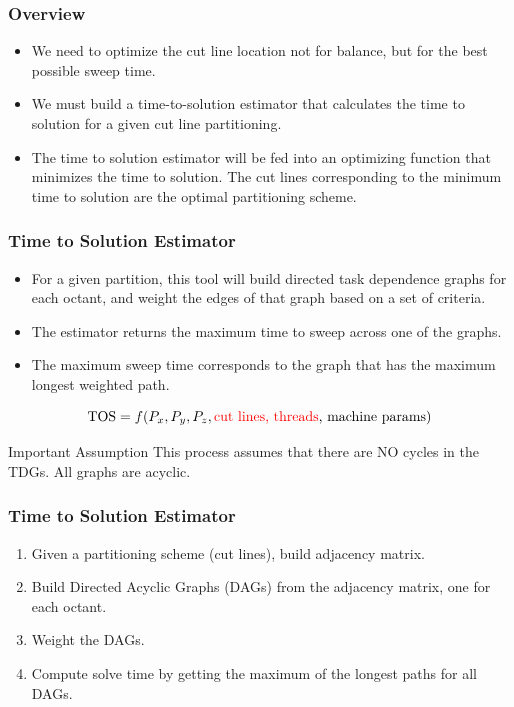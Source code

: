 \documentclass[xcolor={usenames,dvipsnames,svgnames,table}]{beamer}
\begin{document}
\begin{frame}[t]\frametitle{Overview}
\begin{block}{}
\begin{itemize}
	\item We need to optimize the cut line location not for balance, but for the best possible sweep time.
	\item We must build a time-to-solution estimator that calculates the time to solution for a given cut line partitioning.
	\item The time to solution estimator will be fed into an optimizing function that minimizes the time to solution. The cut lines corresponding to the minimum time to solution are the optimal partitioning scheme.
\end{itemize}
\end{block}
\end{frame}

\begin{frame}[t]\frametitle{Time to Solution Estimator}
\begin{block}{}
\begin{itemize}
  \item For a given partition, this tool will build directed task dependence graphs for each octant, and weight the edges of that graph based on a set of criteria.
  \item The estimator returns the maximum time to sweep across one of the graphs.
  \item The maximum sweep time corresponds to the graph that has the maximum longest weighted path. 
\end{itemize}
\end{block}
\begin{block}{}
\begin{equation}
\text{TOS} = f(P_x, P_y, P_z, \text{\textcolor{red}{cut lines, threads}, machine params})
\end{equation}
\end{block}
\begin{block}{Important Assumption}
This process assumes that there are NO cycles in the TDGs. All graphs are acyclic.
\end{block}
\end{frame}

\begin{frame}[t]\frametitle{Time to Solution Estimator}
\begin{block}{}
\begin{enumerate}
	\item Given a partitioning scheme (cut lines), build adjacency matrix.
	\item Build Directed Acyclic Graphs (DAGs) from the adjacency matrix, one for each octant.
	\item Weight the DAGs.
	\item Compute solve time by getting the maximum of the longest paths for all DAGs.
\end{enumerate}
\end{block}
\end{frame}
\end{document}
